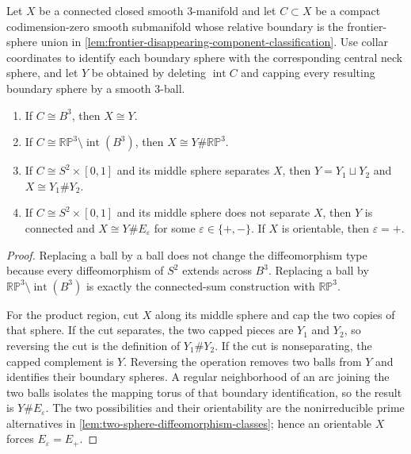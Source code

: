 \begin{lemma}
\label{lem:local-capping-connected-sum-identities}
\notready
Let $X$ be a connected closed smooth $3$-manifold and let
$C\subset X$ be a compact codimension-zero smooth submanifold whose relative
boundary is the frontier-sphere union in
\ref{lem:frontier-disappearing-component-classification}.  Use collar
coordinates to identify each boundary sphere with the corresponding central
neck sphere, and let $Y$ be obtained by deleting $\operatorname{int}C$ and
capping every resulting boundary sphere by a smooth $3$-ball.
\begin{enumerate}
\item If $C\cong B^3$, then $X\cong Y$.
\item If $C\cong\mathbb{RP}^3\setminus\operatorname{int}(B^3)$, then
  $X\cong Y\#\mathbb{RP}^3$.
\item If $C\cong S^2\times[0,1]$ and its middle sphere separates $X$, then
  $Y=Y_1\sqcup Y_2$ and $X\cong Y_1\#Y_2$.
\item If $C\cong S^2\times[0,1]$ and its middle sphere does not separate $X$,
  then $Y$ is connected and $X\cong Y\#E_\varepsilon$ for some
  $\varepsilon\in\{+,-\}$.  If $X$ is orientable, then $\varepsilon=+$.
\end{enumerate}
\end{lemma}

\begin{proof}
Replacing a ball by a ball does not change the diffeomorphism type because
every diffeomorphism of $S^2$ extends across $B^3$.  Replacing a ball by
$\mathbb{RP}^3\setminus\operatorname{int}(B^3)$ is exactly the connected-sum
construction with $\mathbb{RP}^3$.

For the product region, cut $X$ along its middle sphere and cap the two copies
of that sphere.  If the cut separates, the two capped pieces are $Y_1$ and
$Y_2$, so reversing the cut is the definition of $Y_1\#Y_2$.  If the cut is
nonseparating, the capped complement is $Y$.  Reversing the operation removes
two balls from $Y$ and identifies their boundary spheres.  A regular
neighborhood of an arc joining the two balls isolates the mapping torus of
that boundary identification, so the result is $Y\#E_\varepsilon$.  The two
possibilities and their orientability are the nonirreducible prime alternatives
in \ref{lem:two-sphere-diffeomorphism-classes}; hence an orientable $X$ forces
$E_\varepsilon=E_+$.
\end{proof}


